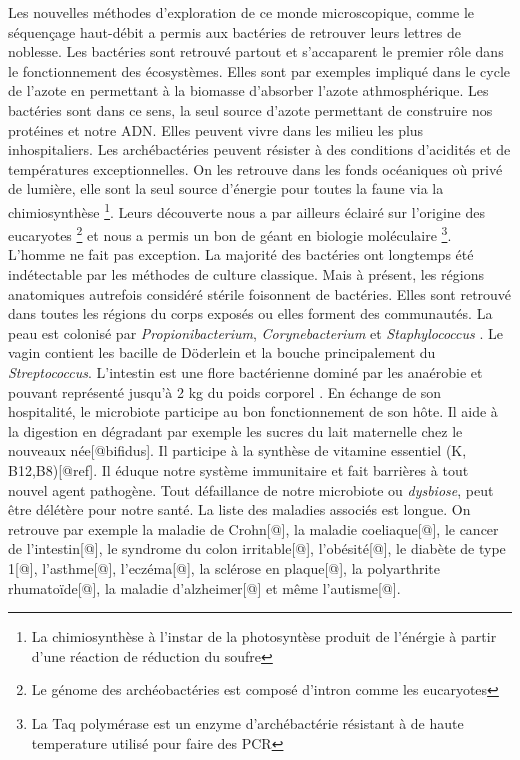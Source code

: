 \documentclass[12pt,a4paper]{article}
\begin{document}
Les nouvelles méthodes d'exploration de ce monde microscopique, comme le séquençage haut-débit a permis aux bactéries de retrouver leurs lettres de noblesse.
Les bactéries sont retrouvé partout et s'accaparent le premier rôle dans le fonctionnement des écosystèmes. Elles sont par exemples impliqué dans le cycle de l'azote en permettant à la biomasse d'absorber l'azote athmosphérique. Les bactéries sont dans ce sens, la seul source d'azote permettant de construire nos protéines et notre ADN.
Elles peuvent vivre dans les milieu les plus inhospitaliers. Les archébactéries peuvent résister à des conditions d'acidités et de températures exceptionnelles. On les retrouve dans les fonds océaniques où privé de lumière, elle sont la seul source d'énergie pour toutes la faune via la chimiosynthèse \footnote{La chimiosynthèse à l'instar de la photosyntèse produit de l'énérgie à partir d'une réaction de réduction du soufre}. Leurs découverte nous a par ailleurs éclairé sur l’origine des eucaryotes \footnote{Le génome des archéobactéries est composé d'intron comme les eucaryotes} et nous a permis un bon de géant en biologie moléculaire \footnote{La Taq polymérase est un enzyme d'archébactérie résistant à de haute temperature utilisé pour faire des PCR}.\\
L'homme ne fait pas exception. La majorité des bactéries ont longtemps été indétectable par les méthodes de culture classique. Mais à présent, les régions anatomiques autrefois considéré stérile foisonnent de bactéries. 
Elles sont retrouvé dans toutes les régions du corps exposés ou elles forment des communautés.
La peau est colonisé par \textit{Propionibacterium}, \textit{Corynebacterium} et \textit{Staphylococcus} \citep{Beck}. Le vagin contient les bacille de Döderlein et la bouche principalement du \textit{Streptococcus}\cite{Beck}.
L'intestin est une flore bactérienne dominé par les anaérobie et pouvant représenté jusqu'à 2 kg du poids corporel \citep{Beck}.
En échange de son hospitalité, le microbiote participe au bon fonctionnement de son hôte. Il aide à la digestion en dégradant par exemple les sucres du lait maternelle chez le nouveaux née[@bifidus]. Il participe à la synthèse de vitamine essentiel (K, B12,B8)[@ref]. Il éduque notre système immunitaire et fait barrières à tout nouvel agent pathogène.
Tout défaillance de notre microbiote ou \textit{dysbiose}, peut être délétère pour notre santé. La liste des maladies associés est longue. On retrouve par exemple la maladie de Crohn[@], la maladie coeliaque[@], le cancer de l’intestin[@], le syndrome du colon irritable[@], l’obésité[@], le diabète de type 1[@], l’asthme[@], l’eczéma[@], la sclérose en plaque[@], la polyarthrite rhumatoïde[@], la maladie d’alzheimer[@] et même l’autisme[@]. \\
\end{document}

